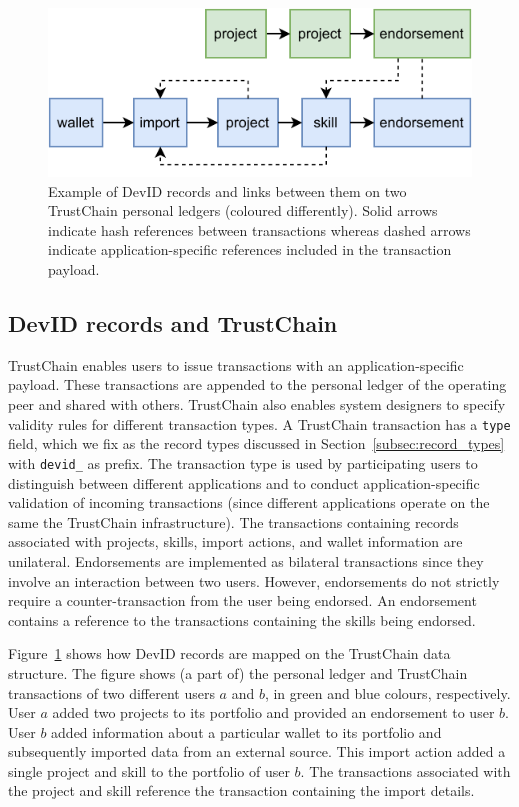 \begin{figure}[t!]
	\centering
	\includegraphics[width=.8\linewidth]{devid/resources/trustchain_devid.pdf}
	\caption{Example of DevID records and links between them on two TrustChain personal ledgers (coloured differently). Solid arrows indicate hash references between transactions whereas dashed arrows indicate application-specific references included in the transaction payload.}
	\label{fig:devid_trustchain}
\end{figure}

\subsection{DevID records and TrustChain}
\label{subsec:devid_record_specs}
TrustChain enables users to issue transactions with an application-specific payload.
These transactions are appended to the personal ledger of the operating peer and shared with others.
TrustChain also enables system designers to specify validity rules for different transaction types.
A TrustChain transaction has a \texttt{type} field, which we fix as the record types discussed in Section~\ref{subsec:record_types} with \texttt{devid\_} as prefix.
The transaction type is used by participating users to distinguish between different applications and to conduct application-specific validation of incoming transactions (since different applications operate on the same the TrustChain infrastructure).
The transactions containing records associated with projects, skills, import actions, and wallet information are unilateral.
Endorsements are implemented as bilateral transactions since they involve an interaction between two users.
However, endorsements do not strictly require a counter-transaction from the user being endorsed.
An endorsement contains a reference to the transactions containing the skills being endorsed.

Figure~\ref{fig:devid_trustchain} shows how DevID records are mapped on the TrustChain data structure.
The figure shows (a part of) the personal ledger and TrustChain transactions of two different users $ a $ and $ b $, in green and blue colours, respectively.
User $ a $ added two projects to its portfolio and provided an endorsement to user $ b $.
User $ b $ added information about a particular wallet to its portfolio and subsequently imported data from an external source.
This import action added a single project and skill to the portfolio of user $ b $.
The transactions associated with the project and skill reference the transaction containing the import details.

